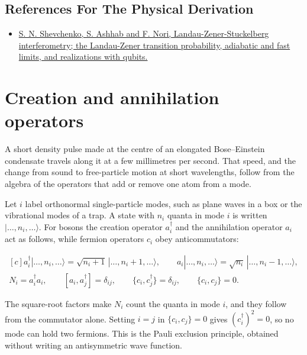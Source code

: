 \documentclass[11pt,oneside]{book}
\newenvironment{centeredalign}{\[\begin{gathered}[c]}{\end{gathered}\]}
\begin{document}
\subsection*{References For The Physical Derivation}
\begin{itemize}
\item \href{https://arxiv.org/abs/0911.1917}{S. N. Shevchenko, S. Ashhab and F. Nori, Landau-Zener-Stuckelberg interferometry; the Landau-Zener transition probability, adiabatic and fast limits, and realizations with qubits.}
\end{itemize}





\clearpage

\section{Creation and annihilation operators}

\label{topic:creation-and-annihilation-operators}

A short density pulse made at the centre of an elongated Bose--Einstein condensate travels along it at a few millimetres per second. That speed, and the change from sound to free-particle motion at short wavelengths, follow from the algebra of the operators that add or remove one atom from a mode.

Let \(i\) label orthonormal single-particle modes, such as plane waves in a box or the vibrational modes of a trap. A state with \(n_i\) quanta in mode \(i\) is written \(|\dots,n_i,\dots\rangle\). For bosons the creation operator \(a_i^\dagger\) and the annihilation operator \(a_i\) act as follows, while fermion operators \(c_i\) obey anticommutators:

\begin{centeredalign}
a_i^\dagger|\dots,n_i,\dots\rangle=\sqrt{n_i+1}\,|\dots,n_i+1,\dots\rangle,\qquad
a_i|\dots,n_i,\dots\rangle=\sqrt{n_i}\,|\dots,n_i-1,\dots\rangle,\\
N_i=a_i^\dagger a_i,\qquad [a_i,a_j^\dagger]=\delta_{ij},\qquad
\{c_i,c_j^\dagger\}=\delta_{ij},\qquad \{c_i,c_j\}=0.
\end{centeredalign}

The square-root factors make \(N_i\) count the quanta in mode \(i\), and they follow from the commutator alone. Setting \(i=j\) in \(\{c_i,c_j\}=0\) gives \((c_i^\dagger)^2=0\), so no mode can hold two fermions. This is the Pauli exclusion principle, obtained without writing an antisymmetric wave function.
\end{document}
